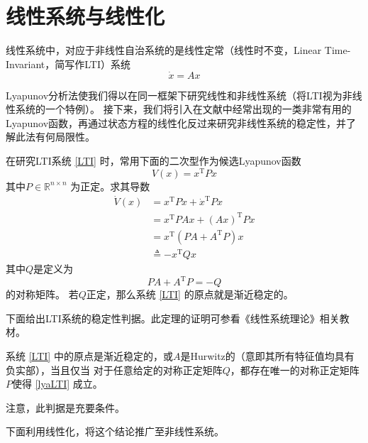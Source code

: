 \section{线性系统与线性化}\label{2Eref}
线性系统中，对应于非线性自治系统的是线性定常（线性时不变，Linear Time-Invariant，简写作LTI）系统
\begin{equation}\label{LTI}
    \dot{x}=Ax
\end{equation}

  Lyapunov分析法使我们得以在同一框架下研究线性和非线性系统（将LTI视为非线性系统的一个特例）。
 接下来，我们将引入在文献中经常出现的一类非常有用的Lyapunov函数，再通过状态方程的线性化反过来研究非线性系统的稳定性，并了解此法有何局限性。

  在研究LTI系统 \eqref{LTI} 时，常用下面的二次型作为候选Lyapunov函数
  \[ V (x) = x^\mathrm{T} P  x \]
  其中$P \in \mathbb{R}^{n \times n}$ 为正定。求其导数
  \begin{align*}
    \dot{V}(x)&= x^\mathrm{T}P\dot{x}+\dot{x}^\mathrm{T}Px\\
    &=x^\mathrm{T}PAx+(Ax)^\mathrm{T}Px\\
    &=x^\mathrm{T} (P  A + A^\mathrm{T} P) x \\
    &\triangleq - x^\mathrm{T} Q  x
  \end{align*}
  其中$Q$是定义为
  \begin{equation}
    P  A + A^\mathrm{T} P = - Q \label{lyaLTI}
  \end{equation}
  的对称矩阵。
  若$Q$正定，那么系统 \eqref{LTI} 的原点就是渐近稳定的。

  下面给出LTI系统的稳定性判据。此定理的证明可参看《线性系统理论》相关教材。
  
  \begin{theorem}[线性定常系统的稳定性判据]\label{linearlya}
    系统 \eqref{LTI} 中的原点是渐近稳定的，或$A$是Hurwitz的（意即其所有特征值均具有负实部），当且仅当
    对于任意给定的对称正定矩阵$Q$，都存在唯一的对称正定矩阵$P$使得 \eqref{lyaLTI} 成立。
  \end{theorem}
  \begin{note}
    注意，此判据是充要条件。
  \end{note}
  
  下面利用线性化，将这个结论推广至非线性系统。


